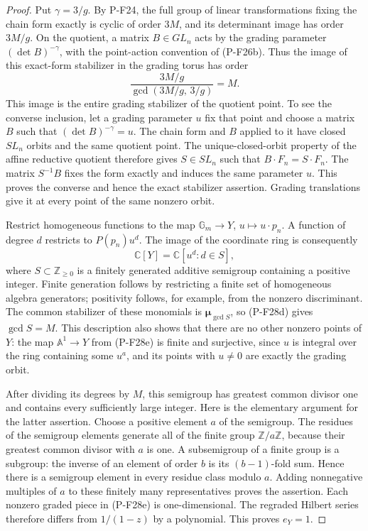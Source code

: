 \begin{proof}
Put $\gamma=3/g$. By P-F24, the full group of linear
transformations fixing the chain form exactly is cyclic
of order $3M$, and its determinant image has order
$3M/g$. On the quotient, a matrix $B\in GL_n$ acts by
the grading parameter $(\det B)^{-\gamma}$, with the
point-action convention of (P-F26b). Thus the image
of this exact-form stabilizer in the grading torus has
order
\[
 \frac{3M/g}{\gcd(3M/g,\,3/g)}=M.
 \tag{P-F28d}
\]
This image is the entire grading stabilizer of the
quotient point. To see the converse inclusion, let a
grading parameter $u$ fix that point and choose a
matrix $B$ such that $(\det B)^{-\gamma}=u$.
The chain form and $B$ applied to it have closed
$SL_n$ orbits and the same quotient point. The
unique-closed-orbit property of the affine reductive
quotient therefore gives $S\in SL_n$ such that
$B\cdot F_n=S\cdot F_n$. The matrix $S^{-1}B$
fixes the form exactly and induces the same parameter
$u$. This proves the converse and hence the exact
stabilizer assertion. Grading translations give it
at every point of the same nonzero orbit.

Restrict homogeneous functions to the map
$\mathbb G_m\to Y$, $u\mapsto u\cdot p_n$.
A function of degree $d$ restricts to $P(p_n)u^d$.
The image of the coordinate ring is consequently
\[
 \mathbb C[Y]=\mathbb C[u^d:d\in S],
 \tag{P-F28e}
\]
where $S\subset\mathbb Z_{\ge0}$ is a finitely generated
additive semigroup containing a positive integer.
Finite generation follows by restricting a finite
set of homogeneous algebra generators; positivity
follows, for example, from the nonzero discriminant.
The common stabilizer of these monomials is
$\boldsymbol\mu_{\gcd S}$, so (P-F28d) gives
$\gcd S=M$.
This description also shows that there are no other
nonzero points of $Y$: the map $\mathbb A^1\to Y$
from (P-F28e) is finite and surjective, since $u$
is integral over the ring containing some $u^a$,
and its points with $u\ne0$ are exactly the grading
orbit.

After dividing its degrees by $M$, this semigroup
has greatest common divisor one and contains every
sufficiently large integer. Here is the elementary
argument for the latter assertion. Choose a positive
element $a$ of the semigroup. The residues of the
semigroup elements generate all of the finite group
$\mathbb Z/a\mathbb Z$, because their greatest common
divisor with $a$ is one. A subsemigroup of a finite
group is a subgroup: the inverse of an element of
order $b$ is its $(b-1)$-fold sum. Hence there is a
semigroup element in every residue class modulo $a$.
Adding nonnegative multiples of $a$ to these finitely
many representatives proves the assertion. Each
nonzero graded piece in (P-F28e) is one-dimensional.
The regraded Hilbert series therefore differs from
$1/(1-z)$ by a polynomial. This proves $e_Y=1$.


\end{proof}
